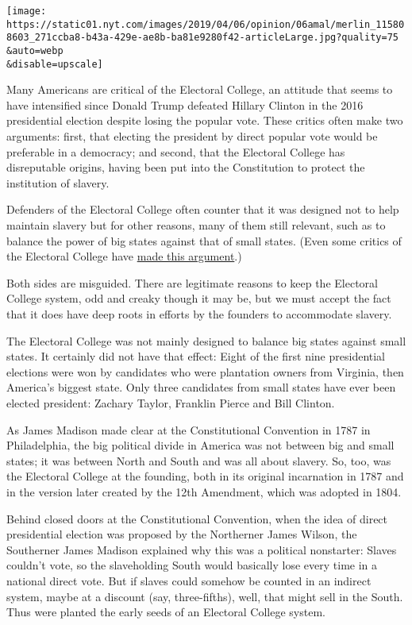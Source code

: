 \texttt{[image: https://static01.nyt.com/images/2019/04/06/opinion/06amal/merlin\_115808603\_271ccba8-b43a-429e-ae8b-ba81e9280f42-articleLarge.jpg?quality=75\\\&auto=webp\\\&disable=upscale]}

Many Americans are critical of the Electoral College, an attitude that
seems to have intensified since Donald Trump defeated Hillary Clinton in
the 2016 presidential election despite losing the popular vote. These
critics often make two arguments: first, that electing the president by
direct popular vote would be preferable in a democracy; and second, that
the Electoral College has disreputable origins, having been put into the
Constitution to protect the institution of slavery.

Defenders of the Electoral College often counter that it was designed
not to help maintain slavery but for other reasons, many of them still
relevant, such as to balance the power of big states against that of
small states. (Even some critics of the Electoral College have
\href{https://www.nytimes.com/2019/04/04/opinion/the-electoral-college-slavery-myth.html}{made
this argument}.)

Both sides are misguided. There are legitimate reasons to keep the
Electoral College system, odd and creaky though it may be, but we must
accept the fact that it does have deep roots in efforts by the founders
to accommodate slavery.

The Electoral College was not mainly designed to balance big states
against small states. It certainly did not have that effect: Eight of
the first nine presidential elections were won by candidates who were
plantation owners from Virginia, then America's biggest state. Only
three candidates from small states have ever been elected president:
Zachary Taylor, Franklin Pierce and Bill Clinton.

As James Madison made clear at the Constitutional Convention in 1787 in
Philadelphia, the big political divide in America was not between big
and small states; it was between North and South and was all about
slavery. So, too, was the Electoral College at the founding, both in its
original incarnation in 1787 and in the version later created by the
12th Amendment, which was adopted in 1804.

Behind closed doors at the Constitutional Convention, when the idea of
direct presidential election was proposed by the Northerner James
Wilson, the Southerner James Madison explained why this was a political
nonstarter: Slaves couldn't vote, so the slaveholding South would
basically lose every time in a national direct vote. But if slaves could
somehow be counted in an indirect system, maybe at a discount (say,
three-fifths), well, that might sell in the South. Thus were planted the
early seeds of an Electoral College system.


